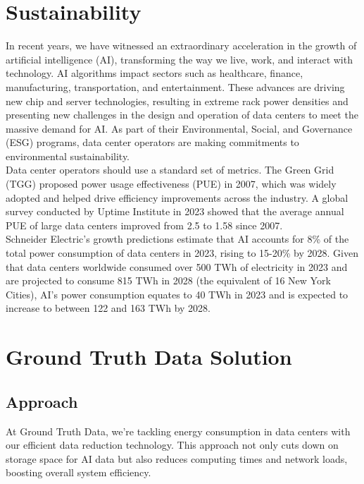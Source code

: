 \section{Sustainability} \label{sec:sed-ultrices}


In recent years, we have witnessed an extraordinary acceleration in the growth of artificial intelligence (AI), transforming the way we live, work, and interact with technology. AI algorithms impact sectors such as healthcare, finance, manufacturing, transportation, and entertainment. These advances are driving new chip and server technologies, resulting in extreme rack power densities and presenting new challenges in the design and operation of data centers to meet the massive demand for AI. As part of their Environmental, Social, and Governance (ESG) programs, data center operators are making commitments to environmental sustainability.\\

Data center operators should use a standard set of metrics. The Green Grid (TGG) proposed power usage effectiveness (PUE) in 2007, which was widely adopted and helped drive efficiency improvements across the industry. A global survey conducted by Uptime Institute in 2023 showed that the average annual PUE of large data centers improved from 2.5 to 1.58 since 2007.\\

Schneider Electric's growth predictions estimate that AI accounts for 8\% of the total power consumption of data centers in 2023, rising to 15-20\% by 2028. Given that data centers worldwide consumed over 500 TWh of electricity in 2023 and are projected to consume 815 TWh in 2028 (the equivalent of 16 New York Cities), AI's power consumption equates to 40 TWh in 2023 and is expected to increase to between 122 and 163 TWh by 2028.


\section{Ground Truth Data Solution}

\subsection{Approach}

At Ground Truth Data, we're tackling energy consumption in data centers with our efficient data reduction technology. This approach not only cuts down on storage space for AI data but also reduces computing times and network loads, boosting overall system efficiency.\\

